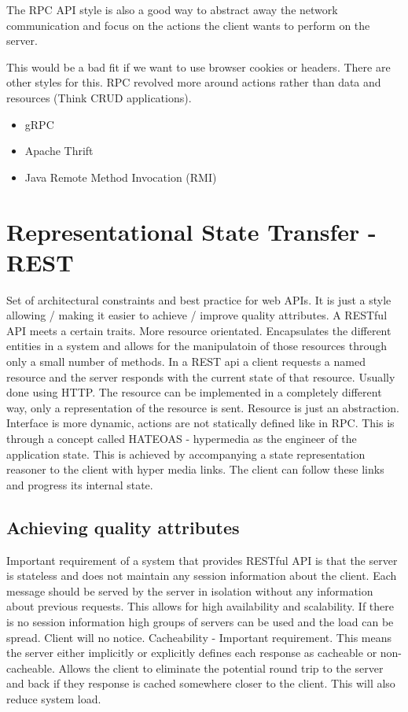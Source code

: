 \documentclass[a4paper, 11pt]{book}
\begin{document}
    The RPC API style is also a good way to abstract away the network communication and focus on the actions the client wants to perform on the server.

    This would be a bad fit if we want to use browser cookies or headers. There are other styles for this.
    RPC revolved more around actions rather than data and resources (Think CRUD applications).


    \begin{itemize}
        \item gRPC
        \item Apache Thrift
        \item Java Remote Method Invocation (RMI)
    \end{itemize}


    \section{Representational State Transfer - REST}
    Set of architectural constraints and best practice for web APIs. It is just a style allowing / making it easier to achieve / improve quality attributes.
    A RESTful API meets a certain traits.
    More resource orientated.
    Encapsulates the different entities in a system and allows for the manipulatoin of those resources through only a small number of methods.
    In a REST api a client requests a named resource and the server responds with the current state of that resource.
    Usually done using HTTP. The resource can be implemented in a completely different way, only a representation of the resource is sent.
    Resource is just an abstraction.
    Interface is more dynamic, actions are not statically defined like in RPC.
    This is through a concept called HATEOAS - hypermedia as the engineer of the application state.
    This is achieved by accompanying a state representation reasoner to the client with hyper media links.
    The client can follow these links and progress its internal state.

    \subsection{Achieving quality attributes}
    Important requirement of a system that provides RESTful API is that the server is stateless and does not maintain any session information about the client.
    Each message should be served by the server in isolation without any information about previous requests.
    This allows for high availability and scalability.
    If there is no session information high groups of servers can be used and the load can be spread. Client will no notice.
    Cacheability - Important requirement.
    This means the server either implicitly or explicitly defines each response as cacheable or non-cacheable.
    Allows the client to eliminate the potential round trip to the server and back if they response is cached somewhere closer to the client.
    This will also reduce system load.
\end{document}
